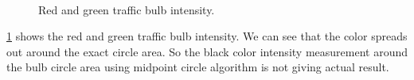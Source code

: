 \begin{figure}[h]
\centering
{}
\\

\caption{Red and green traffic bulb intensity.}
\label{f:bulb_int}
\end{figure}

\ref{f:bulb_int} shows the red and green traffic bulb intensity.
We can see that the color spreads out around the exact circle area.
So the black color intensity measurement around the bulb circle area using midpoint circle algorithm is not giving actual result.

